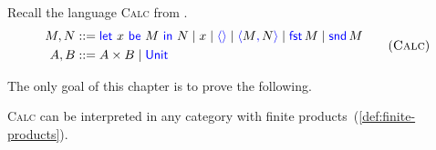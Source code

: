 Recall the language \textsc{Calc} from .
\begin{gather}
  \begin{aligned}
  M,N &::= \pllet{x}{M}{N} \mid x \mid \plunit{} \mid \plpair{M}{N} \mid \plfst{M} \mid \plsnd{M} \\
  A,B &::= A \times B \mid \plUnit
  \end{aligned}
  \tag{\textsc{Calc}}
  \label{lang:calc}
\end{gather}

The only goal of this chapter is to prove the following.
\begin{theorem} \label{thm:calc-products}
  \textsc{Calc} can be interpreted in any category with finite products~(\cref{def:finite-products}).
\end{theorem}



